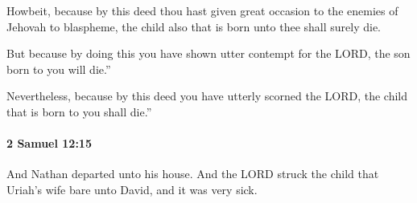 			\begin{versebox}
					\item[BHS] 
					\item[ASV] Howbeit, because by this deed thou hast given great occasion to the enemies of Jehovah to blaspheme, the child also that is born unto thee shall surely die.
					\item[NIV] But because by doing this you have shown utter contempt for the LORD, the son born to you will die.”
					\item[NRSV] Nevertheless, because by this deed you have utterly scorned the LORD, the child that is born to you shall die.”
			\end{versebox}

		\paragraph{2 Samuel 12:15} %
			\label{2SAMUEL-12-15}

			And Nathan departed unto his house. And the LORD struck the child that Uriah’s wife bare unto David, and it was very sick.

